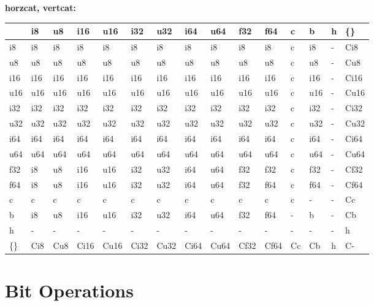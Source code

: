 \textbf{horzcat, vertcat:}
\begin{scriptsize}\begin{tt}\begin{center}\vspace{-.3cm}\begin{tabular}{|m{.65cm}||m{.65cm}|m{.65cm}|m{.65cm}|m{.65cm}|m{.65cm}|m{.65cm}|m{.65cm}|m{.65cm}|m{.65cm}|m{.65cm}|m{.65cm}|m{.65cm}|m{.65cm}|m{.65cm}|}\hline 
&i8&u8&i16&u16&i32&u32&i64&u64&f32&f64&c&b&h&\{\}\\ \hline \hline
i8&i8&i8&i8&i8&i8&i8&i8&i8&i8&i8&c&i8&-&Ci8\\ \hline
u8&u8&u8&u8&u8&u8&u8&u8&u8&u8&u8&c&u8&-&Cu8\\ \hline
i16&i16&i16&i16&i16&i16&i16&i16&i16&i16&i16&c&i16&-&Ci16\\ \hline
u16&u16&u16&u16&u16&u16&u16&u16&u16&u16&u16&c&u16&-&Cu16\\ \hline
i32&i32&i32&i32&i32&i32&i32&i32&i32&i32&i32&c&i32&-&Ci32\\ \hline
u32&u32&u32&u32&u32&u32&u32&u32&u32&u32&u32&c&u32&-&Cu32\\ \hline
i64&i64&i64&i64&i64&i64&i64&i64&i64&i64&i64&c&i64&-&Ci64\\ \hline
u64&u64&u64&u64&u64&u64&u64&u64&u64&u64&u64&c&u64&-&Cu64\\ \hline
f32&i8&u8&i16&u16&i32&u32&i64&u64&f32&f32&c&f32&-&Cf32\\ \hline
f64&i8&u8&i16&u16&i32&u32&i64&u64&f32&f64&c&f64&-&Cf64\\ \hline
c&c&c&c&c&c&c&c&c&c&c&c&-&-&Cc\\ \hline
b&i8&u8&i16&u16&i32&u32&i64&u64&f32&f64&-&b&-&Cb\\ \hline
h&-&-&-&-&-&-&-&-&-&-&-&-&-&h\\ \hline
\{\}&Ci8&Cu8&Ci16&Cu16&Ci32&Cu32&Ci64&Cu64&Cf32&Cf64&Cc&Cb&h&C-\\ \hline
\end{tabular}\end{center}\end{tt}\end{scriptsize} 

\newpage
\section{Bit Operations}

